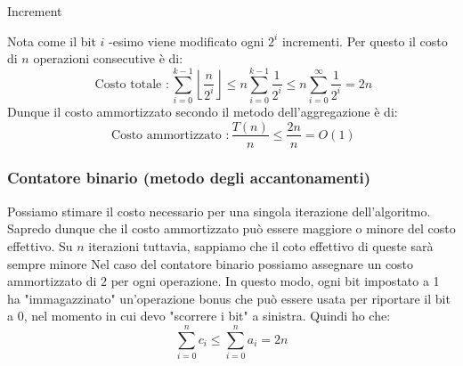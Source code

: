 \vskip3mm
\begin{algoritmo*}{Increment}
	\begin{algorithm}[H]
	\end{algorithm}
\end{algoritmo*}
\vskip3mm

Nota come il bit $ i $ -esimo viene modificato ogni $ 2^{i} $ incrementi. Per questo il costo di $ n $ operazioni consecutive è di:
\[
	\text{ Costo totale }: \sum_{i=0}^{k-1} \left\lfloor \frac{n}{2^{i}} \right\rfloor \le n \sum_{i=0}^{k-1} \frac{1}{2^{i}} \le n \sum_{i=0}^{\infty} \frac{1}{2^{i}} = 2n
\]
Dunque il costo ammortizzato secondo il metodo dell'aggregazione è di:
\[
	\text{ Costo ammortizzato }: \frac{T\left(n\right)}{n} \le \frac{2n}{n} = O\left(1\right)
\]
\subsubsection{Contatore binario (metodo degli accantonamenti)} \label{metodo accantonamenti}
Possiamo stimare il costo necessario per una singola iterazione dell'algoritmo. Sapredo dunque che il costo ammortizzato può essere maggiore o minore del costo effettivo. Su $ n $ iterazioni tuttavia, sappiamo che il coto effettivo di queste sarà sempre minore
\vskip3mm
Nel caso del contatore binario possiamo assegnare un costo ammortizzato di $ 2 $ per ogni operazione. In questo modo, ogni bit impostato a 1 ha "immagazzinato" un'operazione bonus che può essere usata per riportare il bit a 0, nel momento in cui devo "scorrere i bit" a sinistra. Quindi ho che:
\[
	\sum_{i=0}^{n} c_i \le \sum_{i=0}^{n} a_i = 2n
\]

